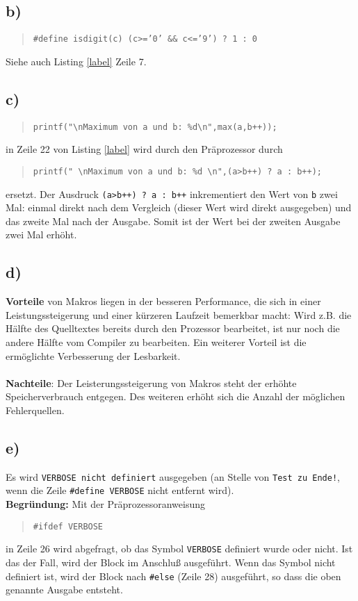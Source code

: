\documentclass[11pt, a4paper]{scrartcl}
\begin{document}
\subsection*{b)}
\begin{quote}
\texttt{\#define isdigit(c) (c>='0' \&\& c<='9') ? 1 : 0}
\end{quote}
Siehe auch Listing \ref{label} Zeile 7.
\subsection*{c)}
\begin{quote}
\texttt{printf("\textbackslash nMaximum von a und b: \%d\textbackslash n",max(a,b++));}
\end{quote}
in Zeile 22 von Listing \ref{label} wird durch den Präprozessor durch 
\begin{quote}
\texttt{printf(" \textbackslash nMaximum von a und b: \%d \textbackslash n",(a>b++) ? a : b++);}
\end{quote}
ersetzt. Der Ausdruck \texttt{(a>b++) ? a : b++} inkrementiert den Wert von \texttt{b} zwei Mal: einmal direkt nach dem Vergleich (dieser Wert wird direkt ausgegeben) und das zweite Mal nach der Ausgabe. Somit ist der Wert bei der zweiten Ausgabe zwei Mal erhöht.
\subsection*{d)} 
\textbf{Vorteile} von Makros liegen in der besseren Performance, die sich in einer Leistungssteigerung und einer kürzeren Laufzeit bemerkbar macht: Wird z.B. die Hälfte des Quelltextes bereits durch den Prozessor bearbeitet, ist nur noch die andere Hälfte vom Compiler zu bearbeiten. Ein weiterer Vorteil ist die ermöglichte Verbesserung der Lesbarkeit.\\\\
\textbf{Nachteile}: Der Leisterungssteigerung von Makros steht der erhöhte Speicherverbrauch entgegen.  Des weiteren erhöht sich die Anzahl der möglichen Fehlerquellen. 
\subsection*{e)}
Es wird \texttt{VERBOSE nicht definiert} ausgegeben (an Stelle von \texttt{Test zu Ende!}, wenn die Zeile \texttt{\#define VERBOSE} nicht entfernt wird).\\
\textbf{Begründung:} Mit der Präprozessoranweisung
\begin{quotation}
\noindent \texttt{\#ifdef VERBOSE}
\end{quotation}
in Zeile 26 wird abgefragt, ob das Symbol \texttt{VERBOSE} definiert wurde oder nicht. Ist das der Fall, wird der Block im Anschluß ausgeführt. Wenn das Symbol
nicht definiert ist, wird der Block nach \texttt{\#else} (Zeile 28) ausgeführt, so dass die oben genannte Ausgabe entsteht.
\vspace{1cm}



\end{document}
